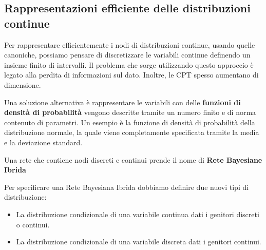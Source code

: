 \subsection{Rappresentazioni efficiente delle distribuzioni continue}
Per rappresentare efficientemente i nodi di distribuzioni continue, usando quelle
canoniche, possiamo pensare di discretizzare le variabili continue definendo un
insieme finito di intervalli. Il problema che sorge utilizzando questo approccio
è legato alla perdita di informazioni sul dato. Inoltre, le CPT spesso aumentano 
di dimensione.

Una soluzione alternativa è rappresentare le variabili con delle \textbf{funzioni
    di densità di probabilità} vengono descritte tramite un numero finito e di
norma contenuto di parametri. Un esempio è la funzione di densità di probabilità
della distribuzione normale, la quale viene completamente specificata tramite
la media e la deviazione standard.
\begin{definizione}
    Una rete che contiene nodi discreti e continui prende il nome di \textbf{Rete
        Bayesiane Ibrida}
\end{definizione}
Per specificare una Rete Bayesiana Ibrida dobbiamo definire due nuovi tipi di
distribuzione:
\begin{itemize}
    \item La distribuzione condizionale di una variabile continua dati i genitori
          discreti o continui.
    \item La distribuzione condizionale di una variabile discreta dati i genitori
          continui.
\end{itemize}